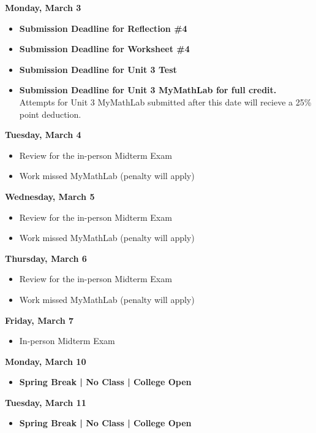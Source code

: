 \documentclass[11pt]{article}
\begin{document}
\textbf{Monday, March 3}

\begin{itemize}
\item \textbf{Submission Deadline for Reflection \#4}
\item \textbf{Submission Deadline for Worksheet \#4}
\item \textbf{Submission Deadline for Unit 3 Test}
\item \textbf{Submission Deadline for Unit 3 MyMathLab for full credit.} Attempts for Unit 3 MyMathLab submitted after this date will recieve a 25\% point deduction.
\end{itemize}

\textbf{Tuesday, March 4}

\begin{itemize}
\item Review for the in-person Midterm Exam
\item Work missed MyMathLab (penalty will apply)
\end{itemize}

\textbf{Wednesday, March 5}

\begin{itemize}
\item Review for the in-person Midterm Exam
\item Work missed MyMathLab (penalty will apply)
\end{itemize}

\textbf{Thursday, March 6}

\begin{itemize}
\item Review for the in-person Midterm Exam
\item Work missed MyMathLab (penalty will apply)
\end{itemize}

\textbf{Friday, March 7}

\begin{itemize}
\item In-person Midterm Exam
\end{itemize}

\textbf{Monday, March 10}

\begin{itemize}
\item \textbf{Spring Break | No Class | College Open}
\end{itemize}

\textbf{Tuesday, March 11}

\begin{itemize}
\item \textbf{Spring Break | No Class | College Open}
\end{itemize}
\end{document}
